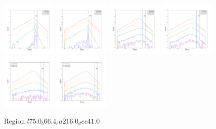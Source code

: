 \documentclass[12pt,prd]{article}
\begin{document}
\begin{figure}[h!]
\includegraphics[width=0.24\textwidth]{../figures/scanning_plotsgaiascan_l75_0_b66_4_ra216_0_dec41_0_npy_12.pdf}
\includegraphics[width=0.24\textwidth]{../figures/scanning_plotsgaiascan_l75_0_b66_4_ra216_0_dec41_0_npy_13.pdf}
\includegraphics[width=0.24\textwidth]{../figures/scanning_plotsgaiascan_l75_0_b66_4_ra216_0_dec41_0_npy_14.pdf}
\includegraphics[width=0.24\textwidth]{../figures/scanning_plotsgaiascan_l75_0_b66_4_ra216_0_dec41_0_npy_15.pdf}
\includegraphics[width=0.24\textwidth]{../figures/scanning_plotsgaiascan_l75_0_b66_4_ra216_0_dec41_0_npy_16.pdf}
\includegraphics[width=0.24\textwidth]{../figures/scanning_plotsgaiascan_l75_0_b66_4_ra216_0_dec41_0_npy_17.pdf}
\caption{Region $l75.0_b66.4_ra216.0_dec41.0$}
\end{figure}
\end{document}
